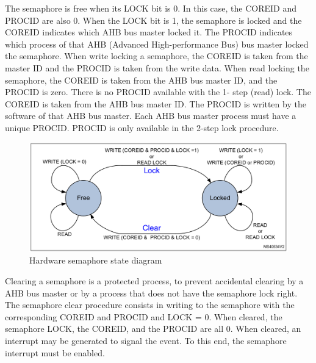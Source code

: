 The semaphore is free when its LOCK bit is 0. In this case, the COREID and PROCID are also 0. When the LOCK bit is 1, the semaphore is locked and the COREID indicates which AHB bus master locked it. The PROCID indicates which process of that AHB (Advanced High-performance Bus) bus master locked the semaphore. When write locking a semaphore, the COREID is taken from the master ID and the PROCID is taken from the write data. When read locking the semaphore, the COREID is taken from the AHB bus master ID, and the PROCID is zero. There is no PROCID available with the 1- step (read) lock. The COREID is taken from the AHB bus master ID. The PROCID is written by the software of that AHB bus master. Each AHB bus master process must have a unique PROCID. PROCID is only available in the 2-step lock procedure.

\begin{figure}[!ht]
    \centering
    \includegraphics[width=150mm, keepaspectratio]{figures/hw-semaphore.png}
    \caption{Hardware semaphore state diagram \cite{HWSemaphore}}
    \label{fig:HWSemaphore}
\end{figure}

Clearing a semaphore is a protected process, to prevent accidental clearing by a AHB bus master or by a process that does not have the semaphore lock right. The semaphore clear procedure consists in writing to the semaphore with the corresponding COREID and PROCID and LOCK = 0. When cleared, the semaphore LOCK, the COREID, and the PROCID are all 0. When cleared, an interrupt may be generated to signal the event. To this end, the semaphore interrupt must be enabled.

